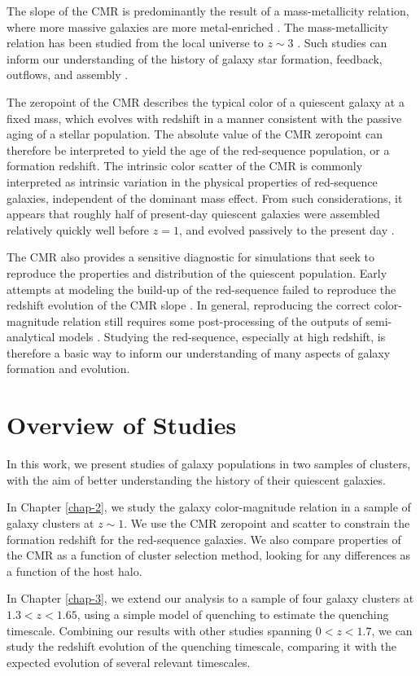 The slope of the CMR is predominantly the result of a mass-metallicity relation, where more massive galaxies are more metal-enriched \citep[e.g.,][]{Bower:1992mb,Kodama:1997rr,Vazdekis:2001aa,2003AJ....125.1866B}.
The mass-metallicity relation has been studied from the local universe to $z\sim3$ \citep{Tremonti:2004aa,Kewley:2008aa,Andrews:2013aa,Erb:2006aa,Maiolino:2008aa,DeGroot:2016aa}.
Such studies can inform our understanding of the history of galaxy star formation, feedback, outflows, and assembly \citep{Finlator:2008aa,Font:2008aa,Peeples:2011aa}.

The zeropoint of the CMR describes the typical color of a quiescent galaxy at a fixed mass, which evolves with redshift in a manner consistent with the passive aging of a stellar population.
The absolute value of the CMR zeropoint can therefore be interpreted to yield the age of the red-sequence population, or a formation redshift.
The intrinsic color scatter of the CMR is commonly interpreted as intrinsic variation in the physical properties of red-sequence galaxies, independent of the dominant mass effect.
From such considerations, it appears that roughly half of present-day quiescent galaxies were assembled relatively quickly well before $z=1$, and evolved passively to the present day \citep[e.g.,][]{Bower:1998cr,Peebles:2002aa,2003ApJ...596L.143B,Mei:2009wt,Foltz:2015aa}.

The CMR also provides a sensitive diagnostic for simulations that seek to reproduce the properties and distribution of the quiescent population.
Early attempts at modeling the build-up of the red-sequence failed to reproduce the redshift evolution of the CMR slope \citep{Romeo:2008aa,Menci:2008aa}.
In general, reproducing the correct color-magnitude relation still requires some post-processing of the outputs of semi-analytical models \citep[see e.g.][]{Ascaso:2015aa}.
Studying the red-sequence, especially at high redshift, is therefore a basic way to inform our understanding of many aspects of galaxy formation and evolution.

\section{Overview of Studies}

In this work, we present studies of galaxy populations in two samples of clusters, with the aim of better understanding the history of their quiescent galaxies.

In Chapter \ref{chap-2}, we study the galaxy color-magnitude relation in a sample of galaxy clusters at $z\sim1$.
We use the CMR zeropoint and scatter to constrain the formation redshift for the red-sequence galaxies.
We also compare properties of the CMR as a function of cluster selection method, looking for any differences as a function of the host halo.

In Chapter \ref{chap-3}, we extend our analysis to a sample of four galaxy clusters at $1.3 < z < 1.65$, using a simple model of quenching to estimate the quenching timescale.
Combining our results with other studies spanning $0 < z < 1.7$, we can study the redshift evolution of the quenching timescale, comparing it with the expected evolution of several relevant timescales.
